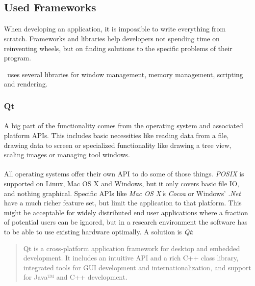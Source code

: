 \subsection{Used Frameworks\label{frameworks}}
\paragraph{}
When developing an application, it is impossible to write everything from scratch.
Frameworks and libraries help developers not spending time on reinventing wheels,
but on finding solutions to the specific problems of their program.

\ER\ uses several libraries for window management, memory management, scripting and rendering.


\subsubsection{Qt\label{FrameworkQt}}
\paragraph{}
A big part of the functionality comes from the operating system and associated platform APIs.
This includes basic necessities like reading data from a file, drawing data to screen or specialized functionality like drawing a tree view, scaling images or managing tool windows.

\paragraph{}
All operating systems offer their own API to do some of those things.
\textit{POSIX} is supported on Linux, Mac OS X and Windows, but it only covers basic file IO, and nothing graphical.
Specific APIs like \textit{Mac OS X'}s \textit{Cocoa} or Windows' \textit{.Net} have a much richer feature set, but limit the application to that platform.
This might be acceptable for widely distributed end user applications where a fraction of potential users can be ignored,
but in a research environment the software has to be able to use existing hardware optimally.
A solution is \textit{Qt}\cite{qt}:

\begin{quotation}
Qt is a cross-platform application framework for desktop and embedded development. It includes an intuitive API and a rich C++ class library, integrated tools for GUI development and internationalization, and support for Java™ and C++ development.
\end{quotation}

